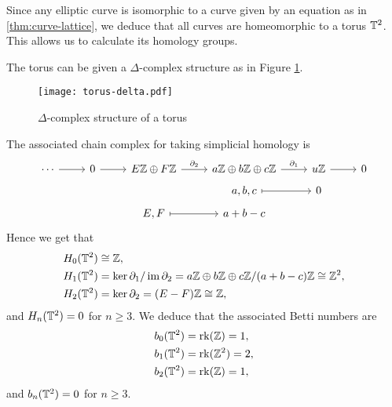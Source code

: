 Since any elliptic curve is isomorphic to a curve given by an equation as in
\ref{thm:curve-lattice}, we deduce that all curves are homeomorphic
to a torus $\mathbb{T}^2$. This allows us to calculate its homology groups.

The torus can be given a $\Delta$-complex structure
as in Figure \ref{fig:torus-delta}.
\begin{figure}[h]
	\centering 
	\texttt{[image: torus-delta.pdf]}
	\caption[torus-delta]{$\Delta$-complex structure of a torus}
	\label{fig:torus-delta}
\end{figure}
The associated chain complex for taking simplicial homology is 
\begin{equation*}
	\begin{tikzcd}[row sep=tiny]
	\cdots & 0 & {E\Z \oplus F\Z} & {a\Z\oplus b\Z\oplus c\Z} & u\Z & 0 \\
	&&& {a,b,c} & 0 \\
	&& {E,F} & {a +b-c}
	\arrow["\partial_1", from=1-4, to=1-5]
	\arrow["\partial_2", from=1-3, to=1-4]
	\arrow[from=1-5, to=1-6]
	\arrow[from=1-2, to=1-3]
	\arrow[from=1-1, to=1-2]
	\arrow[maps to, from=3-3, to=3-4]
	\arrow[maps to, from=2-4, to=2-5]
\end{tikzcd}
\end{equation*}
Hence we get that
\begin{align*}
	H_0(\mathbb{T}^2) &\cong \mathbb{Z},\\
	H_1(\mathbb{T}^2) &= \ker \partial_1 / \operatorname{im} \partial_2
	= a\mathbb{Z} \oplus b\mathbb{Z} \oplus c\mathbb{Z} / (a + b - c)\mathbb{Z} \cong \mathbb{Z}^2,\\
	H_2(\mathbb{T}^2) &= \ker \partial_2 = (E-F)\mathbb{Z} \cong \mathbb{Z},
\end{align*}
and $H_n(\mathbb{T}^2) = 0$ for $n \geq 3$.
We deduce that the associated Betti numbers are
\begin{align*}
	b_0(\mathbb{T}^2) &= \operatorname{rk}(\mathbb{Z}) = 1,\\
	b_1(\mathbb{T}^2) &= \operatorname{rk}(\mathbb{Z}^2) = 2,\\
	b_2(\mathbb{T}^2) &= \operatorname{rk}(\mathbb{Z}) = 1,
\end{align*}
and $b_n(\mathbb{T}^2) = 0$ for $n \geq 3$.
